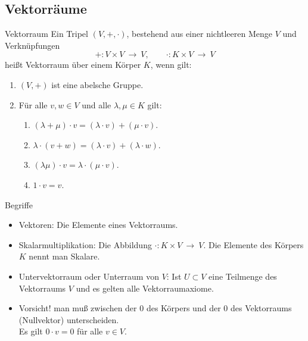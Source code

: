 \documentclass[notes=hide,hyperref={dvipdfmx,pdfpagelabels=false}]{beamer}
\begin{document}
\subsection{Vektorräume}
\begin{frame}{Vektorraum}
Ein Tripel $(V,+,\cdot)$, bestehend aus einer nichtleeren Menge $V$
und Verknüpfungen
\[ +:V \times V \ \rightarrow \ V, \qquad \cdot:K\times V \ \rightarrow \ V\]
heißt {\color{red} Vektorraum} über einem Körper
$K$, wenn gilt:
\begin{enumerate}
\item $(V,+)$ ist eine abelsche Gruppe.
\item Für alle $v,w \in V$ und alle $\lambda, \mu \in K$ gilt:
\begin{enumerate}
 \item $(\lambda + \mu) \cdot v  =(\lambda \cdot v) + ( \mu \cdot v)$.
\item $\lambda \cdot (v + w )  = ( \lambda \cdot v) + ( \lambda \cdot w)$.
\item $(\lambda \mu) \cdot v = \lambda \cdot (\mu \cdot v)$.
\item $1 \cdot v = v$.
\end{enumerate}
\end{enumerate}
\end{frame}

\begin{frame}{Begriffe}
\begin{itemize}
\item {\color{red} Vektoren}: Die Elemente eines Vektorraums.
\item {\color{red} Skalarmultiplikation}: Die Abbildung $\cdot : K\times V \ \rightarrow \ V$. Die Elemente des Körpers $K$ nennt man
  {\color{red} Skalare}.
\item {\color{red} Untervektorraum} oder {\color{red} Unterraum} von $V$: Ist $U \subset V$ eine Teilmenge des Vektorraums $V$ und es gelten
  alle Vektorraumaxiome.
\item \alert{Vorsicht!} man muß zwischen der $0$ des Körpers und der $0$ des Vektorraums (Nullvektor) unterscheiden. \\
Es gilt $0 \cdot v  = 0$ für alle $v \in V$. 
\end{itemize}
\end{frame}
\end{document}
